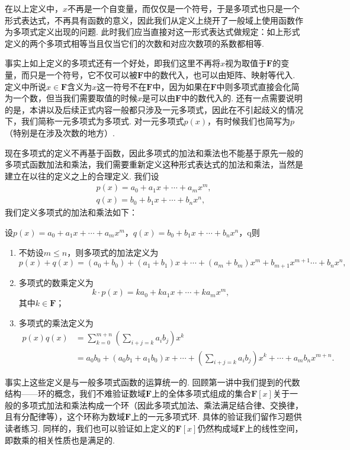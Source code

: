 在以上定义中，$x$不再是一个自变量，而仅仅是一个符号，于是多项式也只是一个形式表达式，不再具有函数的意义，因此我们从定义上绕开了一般域上使用函数作为多项式定义出现的问题. 此时我们应当直接对这一形式表达式做规定：如上形式定义的两个多项式相等当且仅当它们的次数和对应次数项的系数都相等.

事实上如上定义的多项式还有一个好处，即我们这里不再将$x$视为取值于$\mathbf{F}$的变量，而只是一个符号，它不仅可以被$\mathbf{F}$中的数代入，也可以由矩阵、映射等代入. 定义中所说$x\in\mathbf{F}$含义为$x$这一符号不在$\mathbf{F}$中，因为如果在$\mathbf{F}$中则多项式直接会化简为一个数，但当我们需要取值的时候$x$是可以由$\mathbf{F}$中的数代入的. 还有一点需要说明的是，本讲以及后续正式内容一般都只涉及一元多项式，因此在不引起歧义的情况下，我们简称一元多项式为多项式. 对一元多项式$p(x)$，有时候我们也简写为$p$（特别是在涉及次数的地方）.

现在多项式的定义不再基于函数，因此多项式的加法和乘法也不能基于原先一般的多项式函数加法和乘法，我们需要重新定义这种形式表达式的加法和乘法，当然是建立在以往的定义之上的合理定义. 我们设
\begin{gather*}
    p(x)=a_0+a_1x+\cdots+a_mx^m,\\
    q(x)=b_0+b_1x+\cdots+b_nx^n,
\end{gather*}
我们定义多项式的加法和乘法如下：
\begin{definition}
    设$p(x)=a_0+a_1x+\cdots+a_mx^m$，$q(x)=b_0+b_1x+\cdots+b_nx^n$，q则
    \begin{enumerate}
        \item 不妨设$m\leqslant n$，则多项式的加法定义为
                \[p(x)+q(x)=(a_0+b_0)+(a_1+b_1)x+\cdots+(a_m+b_m)x^m+b_{m+1}x^{m+1}\cdots+b_nx^n,\]
        \item 多项式的数乘定义为
              \[k\cdot p(x)=ka_0+ka_1x+\cdots+ka_mx^m,\]
              其中$k\in\mathbf{F}$；
        \item 多项式的乘法定义为
        \begin{align*}
            p(x)q(x)&=\sum_{k=0}^{m+n}\left(\sum_{i+j=k}a_ib_j\right)x^k\\
                    &=a_0b_0+(a_0b_1+a_1b_0)x+\cdots+\left(\sum_{i+j=k}a_ib_j\right)x^k+\cdots+a_mb_nx^{m+n}.
        \end{align*}
    \end{enumerate}
\end{definition}
事实上这些定义是与一般多项式函数的运算统一的. 回顾第一讲中我们提到的代数结构——环的概念，我们不难验证数域$\mathbf{F}$上的全体多项式组成的集合$\mathbf{F}[x]$关于一般的多项式加法和乘法构成一个环（因此多项式加法、乘法满足结合律、交换律，且有分配律等），这个环称为数域$\mathbf{F}$上的一元多项式环. 具体的验证我们留作习题供读者练习. 同样的，我们也可以验证如上定义的$\mathbf{F}[x]$仍然构成域$\mathbf{F}$上的线性空间，即数乘的相关性质也是满足的.

